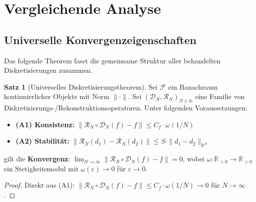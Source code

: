 ﻿\documentclass[a4paper,12pt]{article}
\theoremstyle{definition}
\newtheorem{satz}{Satz}
\begin{document}
\section{Vergleichende Analyse}

\subsection{Universelle Konvergenzeigenschaften}

Das folgende Theorem fasst die gemeinsame Struktur aller behandelten Diskretisierungen zusammen.

\begin{satz}[Universelles Diskretisierungstheorem]
    Sei $\mathcal{F}$ ein Banachraum kontinuierlicher Objekte mit Norm $\|\cdot\|$. Sei $(\mathcal{D}_N, \mathcal{R}_N)_{N\in\mathbb{N}}$ eine Familie von Diskretisierungs-/Rekonstruktionsoperatoren. Unter folgenden Voraussetzungen:
    \begin{itemize}
        \item \textbf{(A1) Konsistenz:} $\|\mathcal{R}_N \circ \mathcal{D}_N(f) - f\| \leq C_f \cdot \omega(1/N)$
        \item \textbf{(A2) Stabilität:} $\|\mathcal{R}_N(d_1) - \mathcal{R}_N(d_2)\| \leq S \cdot \|d_1 - d_2\|_{\mathbb{R}^N}$
    \end{itemize}
    gilt die \textbf{Konvergenz}: $\lim_{N\to\infty}\|\mathcal{R}_N \circ \mathcal{D}_N(f) - f\| = 0$,
    wobei $\omega : \mathbb{R}_{>0} \to \mathbb{R}_{>0}$ ein Stetigkeitsmodul mit $\omega(\varepsilon)\to 0$ für $\varepsilon\to 0$.
\end{satz}

\begin{proof}
    Direkt aus (A1): $\|\mathcal{R}_N \circ \mathcal{D}_N(f) - f\| \leq C_f \cdot \omega(1/N) \to 0$ für $N \to \infty$. \qedhere
\end{proof}
\end{document}
